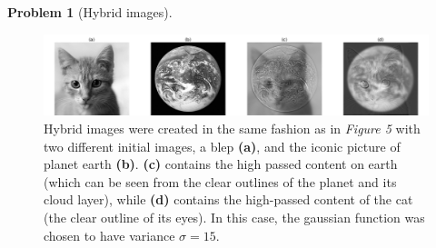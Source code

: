 \documentclass[10pt]{article}
\theoremstyle{plain}
\theoremstyle{definition}
\newtheorem{prob}{Problem}
\numberwithin{equation}{section}
\begin{document}
\begin{prob}[Hybrid images]
\begin{figure}[p]
    \begin{center}
        \includegraphics[width=\textwidth]{earthblep}
        \caption{
        Hybrid images were created in the same fashion as in \textit{Figure 5}
        with two different initial images, a blep \textbf{(a)}, and the iconic picture
        of planet earth \textbf{(b)}. \textbf{(c)} contains the high passed content on earth
        (which can be seen from the clear outlines of the planet and its cloud layer),
        while \textbf{(d)} contains the high-passed content of the cat (the clear outline of its eyes).
        In this case, the gaussian function was chosen to have variance $\sigma=15$.
    }
    \end{center}
\end{figure}
\end{prob}
\end{document}
